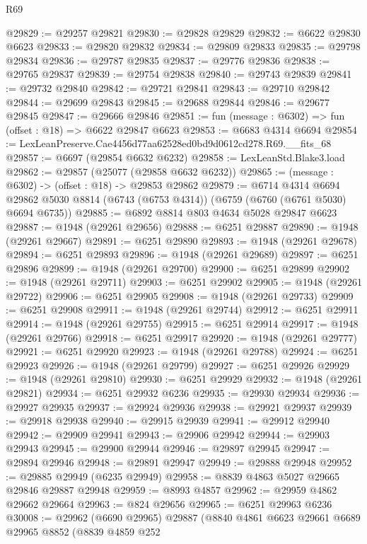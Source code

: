 \begin{lexlean}{R69}
\begin{coremodule}
{@29829 := @29257 @29821
@29830 := @29828 @29829
@29832 := @6622 @29830 @6623
@29833 := @29820 @29832
@29834 := @29809 @29833
@29835 := @29798 @29834
@29836 := @29787 @29835
@29837 := @29776 @29836
@29838 := @29765 @29837
@29839 := @29754 @29838
@29840 := @29743 @29839
@29841 := @29732 @29840
@29842 := @29721 @29841
@29843 := @29710 @29842
@29844 := @29699 @29843
@29845 := @29688 @29844
@29846 := @29677 @29845
@29847 := @29666 @29846
@29851 := fun (message : @6302) => fun (offset : @18) => @6622 @29847 @6623
@29853 := @6683 @4314 @6694
@29854 := LexLeanPreserve.Cae4456d77aa62528ed0bd9d0612cd278.R69.__fits_68
@29857 := @6697 (@29854 @6632 @6232)
@29858 := LexLeanStd.Blake3.load
@29862 := @29857 (@25077 (@29858 @6632 @6232))
@29865 := (message : @6302) -> (offset : @18) -> @29853 @29862
@29879 := @6714
    @4314
    @6694
    @29862
    @5030
    @8814
    (@6743 (@6753 @4314))
    (@6759 (@6760 (@6761 @5030) @6694 @6735))
@29885 := @6892 @8814 @803 @4634 @5028 @29847 @6623
@29887 := @1948 (@29261 @29656)
@29888 := @6251 @29887
@29890 := @1948 (@29261 @29667)
@29891 := @6251 @29890
@29893 := @1948 (@29261 @29678)
@29894 := @6251 @29893
@29896 := @1948 (@29261 @29689)
@29897 := @6251 @29896
@29899 := @1948 (@29261 @29700)
@29900 := @6251 @29899
@29902 := @1948 (@29261 @29711)
@29903 := @6251 @29902
@29905 := @1948 (@29261 @29722)
@29906 := @6251 @29905
@29908 := @1948 (@29261 @29733)
@29909 := @6251 @29908
@29911 := @1948 (@29261 @29744)
@29912 := @6251 @29911
@29914 := @1948 (@29261 @29755)
@29915 := @6251 @29914
@29917 := @1948 (@29261 @29766)
@29918 := @6251 @29917
@29920 := @1948 (@29261 @29777)
@29921 := @6251 @29920
@29923 := @1948 (@29261 @29788)
@29924 := @6251 @29923
@29926 := @1948 (@29261 @29799)
@29927 := @6251 @29926
@29929 := @1948 (@29261 @29810)
@29930 := @6251 @29929
@29932 := @1948 (@29261 @29821)
@29934 := @6251 @29932 @6236
@29935 := @29930 @29934
@29936 := @29927 @29935
@29937 := @29924 @29936
@29938 := @29921 @29937
@29939 := @29918 @29938
@29940 := @29915 @29939
@29941 := @29912 @29940
@29942 := @29909 @29941
@29943 := @29906 @29942
@29944 := @29903 @29943
@29945 := @29900 @29944
@29946 := @29897 @29945
@29947 := @29894 @29946
@29948 := @29891 @29947
@29949 := @29888 @29948
@29952 := @29885 @29949 (@6235 @29949)
@29958 := @8839 @4863 @5027 @29665 @29846 @29887 @29948
@29959 := @8993 @4857
@29962 := @29959 @4862 @29662 @29664
@29963 := @824 @29656
@29965 := @6251 @29963 @6236
@30008 := @29962
    (@6690 @29965)
    @29887
    (@8840
      @4861
      @6623
      @29661
      @6689
      @29965
      @8852
      (@8839
        @4859
        @252
}
\end{coremodule}
\end{lexlean}
